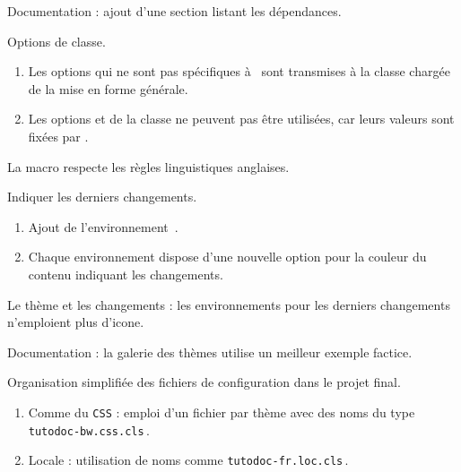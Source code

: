 \begin{tdocnew}
	\item Documentation : ajout d'une section listant les dépendances.

	\item Options de classe.
	\begin{enumerate}
		\item Les options qui ne sont pas spécifiques à \thisproj\ sont transmises à la classe chargée de la mise en forme générale.

		\item Les options  et  de la classe  ne peuvent pas être utilisées, car leurs valeurs sont fixées par \thisproj.
	\end{enumerate}

	\item La macro  respecte les règles linguistiques anglaises.

	\item Indiquer les derniers changements.
	\begin{enumerate}
		\item Ajout de l'environnement \,.

		\item Chaque environnement dispose d'une nouvelle option  pour la couleur du contenu indiquant les changements.
	\end{enumerate}
\end{tdocnew}


\begin{tdocupdate}
	\item Le thème  et les changements : les environnements pour les derniers changements n'emploient plus d'icone.

	\item Documentation : la galerie des thèmes utilise un meilleur exemple factice.
\end{tdocupdate}



\begin{tdoctech}
	\item Organisation simplifiée des fichiers de configuration dans le projet final.
	\begin{enumerate}
		\item Comme du \texttt{CSS} : emploi d'un fichier par thème avec des noms du type \texttt{tutodoc-bw.css.cls}\,.


		\item Locale : utilisation de noms comme \texttt{tutodoc-fr.loc.cls}\,.
	\end{enumerate}
\end{tdoctech}

